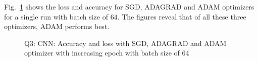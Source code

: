 Fig.~\ref{fig:q3_loss_acc_64} shows the loss and accuracy for SGD, ADAGRAD and ADAM optimizers for a single run with batch size of $64$. The figures reveal that of all these three optimizers, ADAM performs best.
\begin{figure}[!h]
	\centering
	\hspace{0.5cm}
	\hspace{0.5cm}
	\caption{Q3: CNN: Accuracy and loss with SGD, ADAGRAD and ADAM optimizer with increasing epoch with batch size of 64}
	\label{fig:q3_loss_acc_64}
\end{figure}
